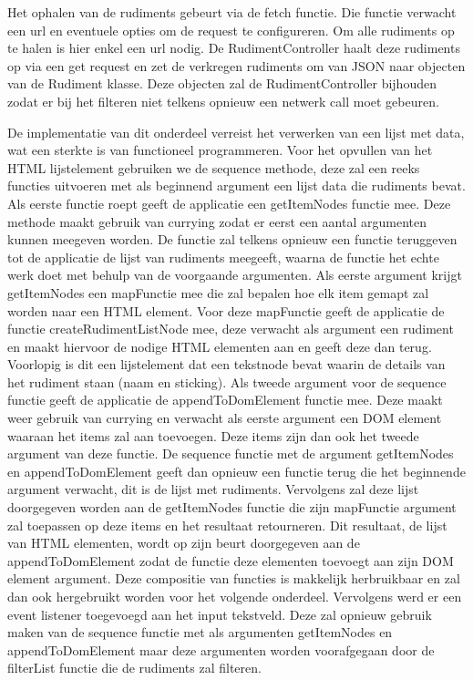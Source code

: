  Het ophalen van de rudiments gebeurt via de fetch functie. Die functie verwacht een url en eventuele opties om de request te configureren. Om alle rudiments op te halen is hier enkel een url nodig. De RudimentController haalt deze rudiments op via een get request en zet de verkregen rudiments om van JSON naar objecten van de Rudiment klasse. Deze objecten zal de RudimentController bijhouden zodat er bij het filteren niet telkens opnieuw een netwerk call moet gebeuren.

De implementatie van dit onderdeel verreist het verwerken van een lijst met data, wat een sterkte is van functioneel programmeren. Voor het opvullen van het HTML lijstelement gebruiken we de sequence methode, deze zal een reeks functies uitvoeren met als beginnend argument een lijst data die rudiments bevat. Als eerste functie roept geeft de applicatie een getItemNodes functie mee. Deze methode maakt gebruik van currying zodat er eerst een aantal argumenten kunnen meegeven worden. De functie zal telkens opnieuw een functie teruggeven tot de applicatie de lijst van rudiments meegeeft, waarna de functie het echte werk doet met behulp van de voorgaande argumenten. Als eerste argument krijgt getItemNodes een mapFunctie mee die zal bepalen hoe elk item gemapt zal worden naar een HTML element. Voor deze mapFunctie geeft de applicatie de functie createRudimentListNode mee, deze verwacht als argument een rudiment en maakt hiervoor de nodige HTML elementen aan en geeft deze dan terug. Voorlopig is dit een lijstelement dat een tekstnode bevat waarin de details van het rudiment staan (naam en sticking). Als tweede argument voor de sequence functie geeft de applicatie de appendToDomElement functie mee. Deze maakt weer gebruik van currying en verwacht als eerste argument een DOM element waaraan het items zal aan toevoegen. Deze items zijn dan ook het tweede argument van deze functie. De sequence functie met de argument getItemNodes en appendToDomElement geeft dan opnieuw een functie terug die het beginnende argument verwacht, dit is de lijst met rudiments. Vervolgens zal deze lijst doorgegeven worden aan de getItemNodes functie die zijn mapFunctie argument zal toepassen op deze items en het resultaat retourneren. Dit resultaat, de lijst van HTML elementen, wordt op zijn beurt doorgegeven aan de appendToDomElement zodat de functie deze elementen toevoegt aan zijn DOM element argument. Deze compositie van functies is makkelijk herbruikbaar en zal dan ook hergebruikt worden voor het volgende onderdeel. Vervolgens werd er een event listener toegevoegd aan het input tekstveld. Deze zal opnieuw gebruik maken van de sequence functie met als argumenten getItemNodes en appendToDomElement maar deze argumenten worden voorafgegaan door de filterList functie die de rudiments zal filteren.

